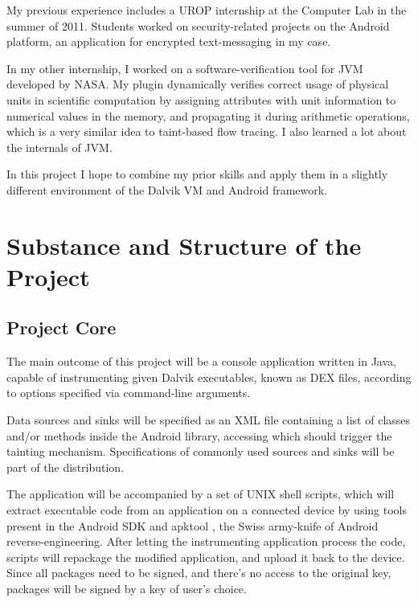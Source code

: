 \documentclass[12pt]{article}
\begin{document}
My previous experience includes a UROP internship at the Computer Lab
in the summer of 2011. Students worked on security-related projects on
the Android platform, an application for encrypted text-messaging in my
case.

In my other internship, I worked on a software-verification tool for JVM 
developed by NASA. My plugin dynamically verifies correct usage of 
physical units in scientific computation by assigning attributes with
unit information to numerical values in the memory, and propagating
it during arithmetic operations, which is a very similar idea to 
taint-based flow tracing. I also learned a lot about the internals of
JVM.

In this project I hope to combine my prior skills and apply them in a 
slightly different environment of the Dalvik VM and Android framework.

\section*{Substance and Structure of the Project}

\subsection*{Project Core}

The main outcome of this project will be a console application written 
in Java, capable of instrumenting given Dalvik executables, known as DEX
files, according to options specified via command-line arguments. 

Data sources and sinks will be specified as an XML file containing a list
of classes and/or methods inside the Android library, accessing which
should trigger the tainting mechanism. Specifications of commonly used 
sources and sinks will be part of the distribution.

The application will be accompanied by a set of UNIX shell scripts, which 
will extract executable code from an application on a connected device 
by using tools present in the Android SDK and apktool 
\cite{code.google.com/p/android-apktool}, the Swiss army-knife of
Android reverse-engineering. After letting the instrumenting application
process the code, scripts will repackage the modified application, and 
upload it back to the device. Since all packages need to be signed, and
there's no access to the original key, packages will be signed by a 
key of user's choice.
\end{document}
